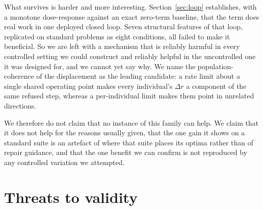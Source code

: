 \documentclass[11pt,a4paper]{article}
\begin{document}
What survives is harder and more interesting. Section~\ref{sec:loop} establishes, with a
monotone dose-response against an exact zero-term baseline, that the term does real work
in one deployed closed loop. Seven structural features of that loop, replicated on standard problems as eight
conditions, all failed to make it beneficial. So we are left with a mechanism that
is reliably harmful in every controlled setting we could construct and reliably helpful in
the uncontrolled one it was designed for, and we cannot yet say why. We name the
population-coherence of the displacement as the leading candidate: a rate limit about a
single shared operating point makes every individual's $\Delta r$ a component of the same
refused step, whereas a per-individual limit makes them point in unrelated directions.

We therefore do not claim that no instance of this family can help. We claim that it does
not help for the reasons usually given, that the one gain it shows on a standard suite is
an artefact of where that suite places its optima rather than of repair guidance, and that
the one benefit we can confirm is not reproduced by any controlled variation we attempted.

\section{Threats to validity}
\end{document}
